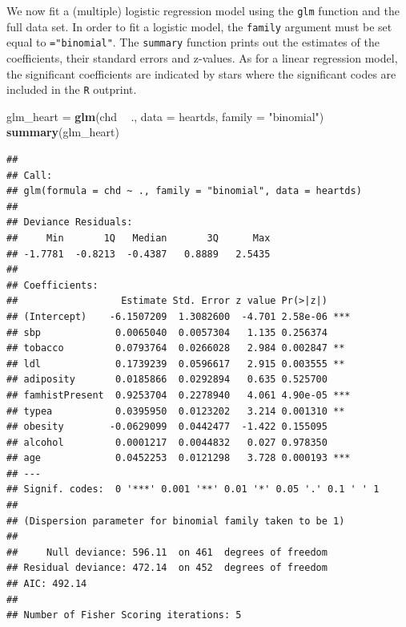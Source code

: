 \documentclass[10pt,ignorenonframetext,]{beamer}
\newenvironment{Shaded}{\begin{snugshade}}{\end{snugshade}}
\newcommand{\KeywordTok}[1]{\textcolor[rgb]{0.13,0.29,0.53}{\textbf{#1}}}
\newcommand{\DataTypeTok}[1]{\textcolor[rgb]{0.13,0.29,0.53}{#1}}
\newcommand{\StringTok}[1]{\textcolor[rgb]{0.31,0.60,0.02}{#1}}
\newcommand{\OperatorTok}[1]{\textcolor[rgb]{0.81,0.36,0.00}{\textbf{#1}}}
\newcommand{\NormalTok}[1]{#1}
\begin{document}
\begin{frame}[fragile]

We now fit a (multiple) logistic regression model using the \texttt{glm}
function and the full data set. In order to fit a logistic model, the
\texttt{family} argument must be set equal to \texttt{="binomial"}. The
\texttt{summary} function prints out the estimates of the coefficients,
their standard errors and z-values. As for a linear regression model,
the significant coefficients are indicated by stars where the
significant codes are included in the \texttt{R} outprint.

\end{frame}

\begin{frame}[fragile]

\footnotesize

\begin{Shaded}
\begin{Highlighting}[]
\NormalTok{glm_heart =}\StringTok{ }\KeywordTok{glm}\NormalTok{(chd }\OperatorTok{~}\StringTok{ }\NormalTok{., }\DataTypeTok{data =}\NormalTok{ heartds, }\DataTypeTok{family =} \StringTok{"binomial"}\NormalTok{)}
\KeywordTok{summary}\NormalTok{(glm_heart)}
\end{Highlighting}
\end{Shaded}

\begin{verbatim}
## 
## Call:
## glm(formula = chd ~ ., family = "binomial", data = heartds)
## 
## Deviance Residuals: 
##     Min       1Q   Median       3Q      Max  
## -1.7781  -0.8213  -0.4387   0.8889   2.5435  
## 
## Coefficients:
##                  Estimate Std. Error z value Pr(>|z|)    
## (Intercept)    -6.1507209  1.3082600  -4.701 2.58e-06 ***
## sbp             0.0065040  0.0057304   1.135 0.256374    
## tobacco         0.0793764  0.0266028   2.984 0.002847 ** 
## ldl             0.1739239  0.0596617   2.915 0.003555 ** 
## adiposity       0.0185866  0.0292894   0.635 0.525700    
## famhistPresent  0.9253704  0.2278940   4.061 4.90e-05 ***
## typea           0.0395950  0.0123202   3.214 0.001310 ** 
## obesity        -0.0629099  0.0442477  -1.422 0.155095    
## alcohol         0.0001217  0.0044832   0.027 0.978350    
## age             0.0452253  0.0121298   3.728 0.000193 ***
## ---
## Signif. codes:  0 '***' 0.001 '**' 0.01 '*' 0.05 '.' 0.1 ' ' 1
## 
## (Dispersion parameter for binomial family taken to be 1)
## 
##     Null deviance: 596.11  on 461  degrees of freedom
## Residual deviance: 472.14  on 452  degrees of freedom
## AIC: 492.14
## 
## Number of Fisher Scoring iterations: 5
\end{verbatim}

\normalsize

\end{frame}
\end{document}
